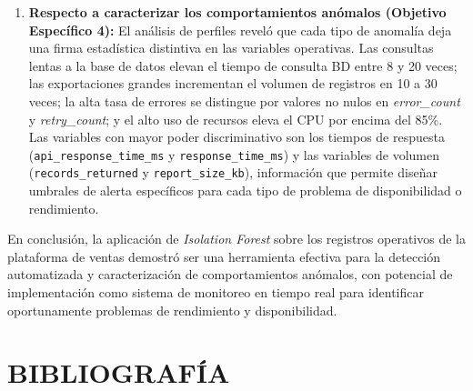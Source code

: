 \documentclass[12pt,letterpaper, oneside]{book}
\begin{document}
\begin{enumerate}
        \item \textbf{Respecto a caracterizar los comportamientos anómalos
        (Objetivo Específico 4):} El análisis de perfiles reveló que cada
        tipo de anomalía deja una firma estadística distintiva en las
        variables operativas. Las consultas lentas a la base de datos
        elevan el tiempo de consulta BD entre 8 y 20 veces; las
        exportaciones grandes incrementan el volumen de registros en
        10 a 30 veces; la alta tasa de errores se distingue por valores
        no nulos en \textit{error\_count} y \textit{retry\_count}; y
        el alto uso de recursos eleva el CPU por encima del 85\%.
        Las variables con mayor poder discriminativo son los tiempos de
        respuesta (\texttt{api\_response\_time\_ms} y
        \texttt{response\_time\_ms}) y las variables de volumen
        (\texttt{records\_returned} y \texttt{report\_size\_kb}),
        información que permite diseñar umbrales de alerta específicos
        para cada tipo de problema de disponibilidad o rendimiento.
    \end{enumerate}

    En conclusión, la aplicación de \textit{Isolation Forest} sobre los
    registros operativos de la plataforma de ventas demostró ser una
    herramienta efectiva para la detección automatizada y caracterización
    de comportamientos anómalos, con potencial de implementación como
    sistema de monitoreo en tiempo real para identificar oportunamente
    problemas de rendimiento y disponibilidad.

    \chapter{BIBLIOGRAFÍA}

    
    
\end{document}
